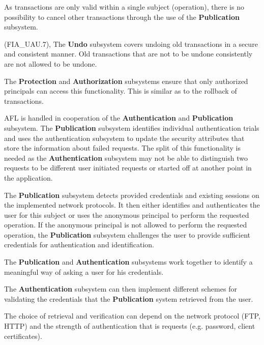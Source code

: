 \documentclass[12pt,english]{scrbook}
\begin{document}
As transactions are only valid within a single subject (operation), there is no
possibility to cancel other transactions through the use of the
\textbf{Publication} subsystem.

(FIA{\_}UAU.7), 
The \textbf{Undo} subsystem covers undoing old transactions in a secure and
consistent manner. Old transactions that are not to be undone consistently
are not allowed to be undone.

The \textbf{Protection} and \textbf{Authorization} subsystems ensure that only
authorized principals can access this functionality. This is similar as to the
rollback of transactions.


AFL is handled in cooperation of the \textbf{Authentication} and
\textbf{Publication} subsystem. The \textbf{Publication} subsystem identifies
individual authentication trials and uses the authentication subsystem to
update the security attributes that store the information about failed
requests. The split of this functionality is needed as the
\textbf{Authentication} subsystem may not be able to distinguish two requests
to be different user initiated requests or started off at another point in the
application.
  


The \textbf{Publication} subsystem detects provided credentials and existing
sessions on the implemented network protocols. It then either identifies and
authenticates the user for this subject or uses the anonymous principal to
perform the requested operation. If the anonymous principal is not allowed to
perform the requested operation, the \textbf{Publication} subsystem challenges
the user to provide sufficient credentials for authentication and
identification.


The \textbf{Publication} and \textbf{Authentication} subsystems work together
to identify a meaningful way of asking a user for his credentials. 

The \textbf{Authentication} subsystem can then implement different schemes for
validating the credentials that the \textbf{Publication} system retrieved from
the user.

The choice of retrieval and verification can depend on the network protocol
(FTP, HTTP) and the strength of authentication that is requests (e.g. password,
client certificates).
\end{document}
